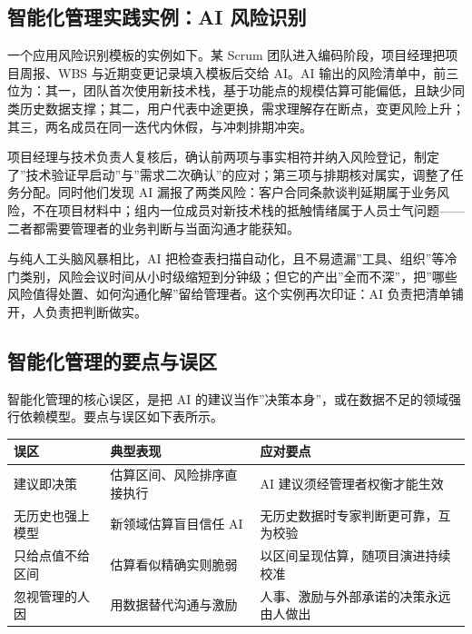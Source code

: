 \documentclass[12pt,a4paper,twoside,openany]{ctexbook}
\numberwithin{figure}{chapter}
\numberwithin{table}{chapter}
\newcounter{none}
\begin{document}
\subsection{智能化管理实践实例：AI
风险识别}\label{ux667aux80fdux5316ux7ba1ux7406ux5b9eux8df5ux5b9eux4f8bai-ux98ceux9669ux8bc6ux522b}

一个应用风险识别模板的实例如下。某 Scrum
团队进入编码阶段，项目经理把项目周报、WBS 与近期变更记录填入模板后交给
AI。AI
输出的风险清单中，前三位为：其一，团队首次使用新技术栈，基于功能点的规模估算可能偏低，且缺少同类历史数据支撑；其二，用户代表中途更换，需求理解存在断点，变更风险上升；其三，两名成员在同一迭代内休假，与冲刺排期冲突。

项目经理与技术负责人复核后，确认前两项与事实相符并纳入风险登记，制定了''技术验证早启动''与''需求二次确认''的应对；第三项与排期核对属实，调整了任务分配。同时他们发现
AI
漏报了两类风险：客户合同条款谈判延期属于业务风险，不在项目材料中；组内一位成员对新技术栈的抵触情绪属于人员士气问题------二者都需要管理者的业务判断与当面沟通才能获知。

与纯人工头脑风暴相比，AI
把检查表扫描自动化，且不易遗漏''工具、组织''等冷门类别，风险会议时间从小时级缩短到分钟级；但它的产出''全而不深''，把''哪些风险值得处置、如何沟通化解''留给管理者。这个实例再次印证：AI
负责把清单铺开，人负责把判断做实。

\subsection{智能化管理的要点与误区}\label{ux667aux80fdux5316ux7ba1ux7406ux7684ux8981ux70b9ux4e0eux8befux533a}

智能化管理的核心误区，是把 AI
的建议当作''决策本身''，或在数据不足的领域强行依赖模型。要点与误区如下表所示。

{\def\LTcaptype{none} %
\begin{longtable}[]{@{}
  >{\raggedright\arraybackslash}p{}
  >{\raggedright\arraybackslash}p{}
  >{\raggedright\arraybackslash}p{}@{}}
\toprule\noalign{}
\begin{minipage}[b]{\linewidth}\raggedright
误区
\end{minipage} & \begin{minipage}[b]{\linewidth}\raggedright
典型表现
\end{minipage} & \begin{minipage}[b]{\linewidth}\raggedright
应对要点
\end{minipage} \\
\midrule\noalign{}
\endhead
\bottomrule\noalign{}
\endlastfoot
建议即决策 & 估算区间、风险排序直接执行 & AI
建议须经管理者权衡才能生效 \\
无历史也强上模型 & 新领域估算盲目信任 AI &
无历史数据时专家判断更可靠，互为校验 \\
只给点值不给区间 & 估算看似精确实则脆弱 &
以区间呈现估算，随项目演进持续校准 \\
忽视管理的人因 & 用数据替代沟通与激励 &
人事、激励与外部承诺的决策永远由人做出 \\
\end{longtable}
}
\end{document}
